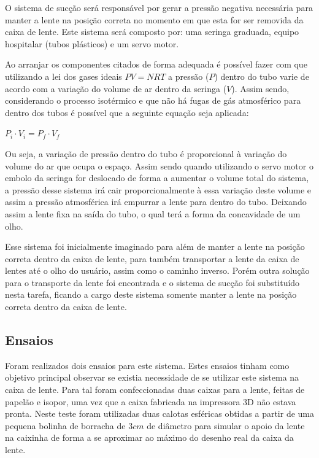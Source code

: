 O sistema de sucção será responsável por gerar a pressão negativa necessária para manter a lente na posição correta no momento em que esta for ser removida da caixa de lente. Este sistema será composto por: uma seringa graduada, equipo hospitalar (tubos plásticos) e um servo motor. 

Ao arranjar os componentes citados de forma adequada é possível fazer com que utilizando a lei dos gases ideais $PV= NRT$ a pressão ($P$) dentro do tubo varie de acordo com a variação do volume de ar dentro da seringa ($V$). Assim sendo, considerando o processo isotérmico e que não há fugas de gás atmosférico para dentro dos tubos é possível que a seguinte equação seja aplicada:


\begin{center}
$P_i \cdot V_i = P_f \cdot V_f$
\end{center}

Ou seja, a variação de pressão dentro do tubo é proporcional à variação do volume do ar que ocupa o espaço. Assim sendo quando utilizando o servo motor o embolo da seringa for deslocado de forma a aumentar o volume total do sistema, a pressão desse sistema irá cair proporcionalmente à essa variação deste volume e assim a pressão atmosférica irá empurrar a lente para dentro do tubo. Deixando assim a lente fixa na saída do tubo, o qual terá a forma da concavidade de um olho.

Esse sistema foi inicialmente imaginado para além de manter a lente na posição correta dentro da caixa de lente, para também transportar a lente da caixa de lentes até o olho do usuário, assim como o caminho inverso.  Porém outra solução para o transporte da lente foi encontrada e o sistema de sucção foi substituído nesta tarefa, ficando a cargo deste sistema somente manter a lente na posição correta dentro da caixa de lente.


\subsection[Ensaios]{Ensaios}

Foram realizados dois ensaios para este sistema. Estes ensaios tinham como objetivo principal observar se existia necessidade de se utilizar este sistema na caixa de lente. Para tal foram confeccionadas duas caixas para a lente, feitas de papelão e isopor, uma vez que a caixa fabricada na impressora 3D não estava pronta. Neste teste foram utilizadas duas calotas esféricas obtidas a partir de uma pequena bolinha de borracha de 3$cm$ de diâmetro para simular o apoio da lente na caixinha de forma a se aproximar ao máximo do desenho real da caixa da lente. 

